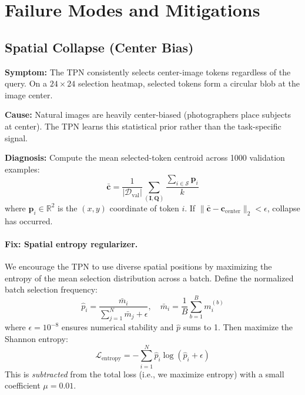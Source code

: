 \documentclass[12pt,a4paper]{article}
\newcommand{\R}{\mathbb{R}}
\newcommand{\mI}{\mathbf{I}}     %
\newcommand{\mQ}{\mathbf{Q}}     %
\begin{document}
\section{Failure Modes and Mitigations}
\label{sec:failures}

\subsection{Spatial Collapse (Center Bias)}

\begin{warnbox}[title={Failure Mode 1: Spatial Collapse}]
\textbf{Symptom:} The TPN consistently selects center-image tokens regardless of
the query. On a $24 \times 24$ selection heatmap, selected tokens form a
circular blob at the image center.

\textbf{Cause:} Natural images are heavily center-biased (photographers place
subjects at center). The TPN learns this statistical prior rather than the
task-specific signal.

\textbf{Diagnosis:} Compute the mean selected-token centroid across 1000
validation examples:
\[
  \bar{\mathbf{c}} = \frac{1}{|\mathcal{D}_{\mathrm{val}}|}
    \sum_{(\mI,\mQ)} \frac{\sum_{i \in \mathcal{S}} \mathbf{p}_i}{k}
\]
where $\mathbf{p}_i \in \R^2$ is the $(x,y)$ coordinate of token $i$. If
$\|\bar{\mathbf{c}} - \mathbf{c}_{\mathrm{center}}\|_2 < \epsilon$, collapse
has occurred.
\end{warnbox}

\paragraph{Fix: Spatial entropy regularizer.}
We encourage the TPN to use diverse spatial positions by maximizing the entropy
of the mean selection distribution across a batch. Define the normalized batch
selection frequency:
\[
  \hat{p}_i = \frac{\bar{m}_i}{\sum_{j=1}^N \bar{m}_j + \epsilon},
  \quad \bar{m}_i = \frac{1}{B} \sum_{b=1}^B m_i^{(b)}
\]
where $\epsilon = 10^{-8}$ ensures numerical stability and $\hat{p}$ sums to 1.
Then maximize the Shannon entropy:
\begin{equation}
  \mathcal{L}_{\mathrm{entropy}} = -\sum_{i=1}^N
    \hat{p}_i \log(\hat{p}_i + \epsilon)
  \label{eq:entropy_reg}
\end{equation}
This is \emph{subtracted} from the total loss (i.e., we maximize entropy) with a
small coefficient $\mu = 0.01$.
\end{document}
